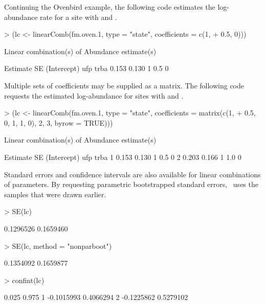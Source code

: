 \documentclass[article,shortnames]{jss}
\newcommand{\um}{\pkg{unmarked}}
\begin{document}
Continuing the Ovenbird example, the following code estimates the
log-abundance rate for a site with  and .

\begin{Schunk}
\begin{Sinput}
> (lc <- linearComb(fm.oven.1, type = "state", coefficients = c(1, 
+     0.5, 0)))
\end{Sinput}
\begin{Soutput}
Linear combination(s) of Abundance estimate(s)

 Estimate    SE (Intercept) ufp trba
    0.153 0.130           1 0.5    0
\end{Soutput}
\end{Schunk}

Multiple sets of coefficients may be supplied as a matrix.  The
following code requests the estimated log-abundance for sites with
 and .

\begin{Schunk}
\begin{Sinput}
> (lc <- linearComb(fm.oven.1, type = "state", coefficients = matrix(c(1, 
+     0.5, 0, 1, 1, 0), 2, 3, byrow = TRUE)))
\end{Sinput}
\begin{Soutput}
Linear combination(s) of Abundance estimate(s)

  Estimate    SE (Intercept) ufp trba
1    0.153 0.130           1 0.5    0
2    0.203 0.166           1 1.0    0
\end{Soutput}
\end{Schunk}

Standard errors and confidence intervals are also available for linear
combinations of parameters.  By requesting parametric bootstrapped
standard errors, \um\ uses the samples that were drawn earlier.

\begin{Schunk}
\begin{Sinput}
> SE(lc)
\end{Sinput}
\begin{Soutput}
[1] 0.1296526 0.1659460
\end{Soutput}
\begin{Sinput}
> SE(lc, method = "nonparboot")
\end{Sinput}
\begin{Soutput}
[1] 0.1354092 0.1659877
\end{Soutput}
\begin{Sinput}
> confint(lc)
\end{Sinput}
\begin{Soutput}
       0.025     0.975
1 -0.1015993 0.4066294
2 -0.1225862 0.5279102
\end{Soutput}
\end{Schunk}
\end{document}
